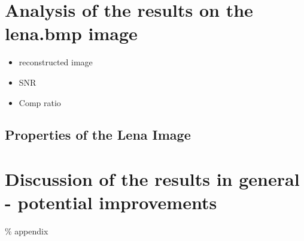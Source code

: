 \documentclass[a4paper]{article}
\begin{document}
\section{Analysis of the results on the lena.bmp image}
\begin{itemize}

    \item reconstructed image

    \item SNR

    \item Comp ratio
\end{itemize}

\subsection{Properties of the Lena Image}


\section{Discussion of the results in general - potential improvements}

%     
%         

\clearpage
\% appendix 
% 
% 
\end{document}
